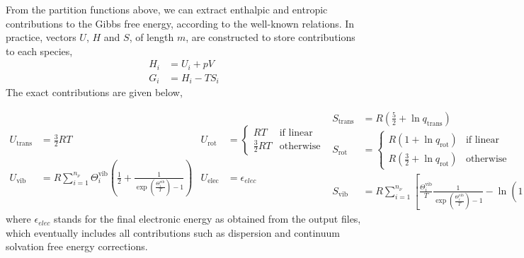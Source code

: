 From the partition functions above,
we can extract enthalpic and entropic contributions to the Gibbs free energy,
according to the well-known relations.
In practice,
vectors $U$,
$H$ and $S$,
of length $m$,
are constructed to store contributions to each species,
% 
\begin{equation}
	\begin{split}
		H_i &= U_i + p V \\
		G_i & = H_i - T S_i
	\end{split}
\end{equation}
% 
The exact contributions are given below,

\begin{subequations}
	\begin{align}
		U_\text{trans}
		 & = \frac{3}{2} R T
		 & U_\text{rot}
		 & = \begin{cases}
			     R T             & \text{if linear} \\
			     \frac{3}{2} R T & \text{otherwise}
		     \end{cases} \\
		U_\text{vib}
		 & = R \sum_{i = 1}^{n_\nu}
		\Theta^\text{vib}_i
		\left(
		\frac{1}{2}
		+ \frac{1}{
			\exp \left( \frac{\Theta^\text{vib}_i}{T}\right)
			- 1
		}
		\right)
		 & U_\text{elec}
		 & = \epsilon_{elec}
	\end{align}
	\begin{align}
		S_\text{trans}
		 & = R \left(
		\frac{5}{2}
		+ \ln{q_\text{trans}}
		\right)
		 & S_\text{elec}
		 & = R \ln{q_\text{elec}}                           \\
		S_\text{rot}
		 & = \begin{cases}
			     R \left(
			     1
			     + \ln{q_\text{rot}}
			     \right) & \text{if linear} \\
			     R \left(
			     \frac{3}{2}
			     + \ln{q_\text{rot}}
			     \right) & \text{otherwise}
		     \end{cases} \\
		S_\text{vib}
		 & = R \sum_{i = 1}^{n_\nu}
		\left[
			\frac{
				\Theta^\text{vib}_i
			}{T}
			\frac{1}{
				\exp \left( \frac{\Theta^\text{vib}_i}{T}\right)
				- 1
			}
			- \ln{\left(
				1
				- \exp \left( - \frac{\Theta^\text{vib}_i}{T}\right)
				\right)}
			\right]
	\end{align}
\end{subequations}
% 
where $\epsilon_{elec}$ stands for the final electronic energy as obtained from the output files,
which eventually includes all contributions such as dispersion and continuum solvation free energy corrections.

